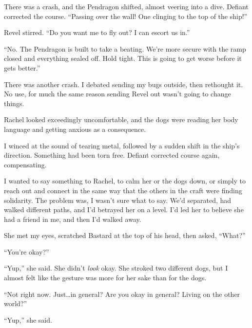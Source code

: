 There was a crash, and the Pendragon shifted, almost veering into a dive.  Defiant corrected the course.  ``Passing over the wall!  One clinging to the top of the ship!''



Revel stirred.  ``Do you want me to fly out?  I can escort us in.''



``No.  The Pendragon is built to take a beating.  We're more secure with the ramp closed and everything sealed off.  Hold tight.  This is going to get worse before it gets better.''



There was another crash.  I debated sending my bugs outside, then rethought it.  No use, for much the same reason sending Revel out wasn't going to change things.



Rachel looked exceedingly uncomfortable, and the dogs were reading her body language and getting anxious as a consequence.



I winced at the sound of tearing metal, followed by a sudden shift in the ship's direction.  Something had been torn free.  Defiant corrected course again, compensating.



I wanted to say something to Rachel, to calm her or the dogs down, or simply to reach out and connect in the same way that the others in the craft were finding solidarity.  The problem was, I wasn't sure what to say.  We'd separated, had walked different paths, and I'd betrayed her on a level.  I'd led her to believe she had a friend in me, and then I'd walked away.



She met my eyes, scratched Bastard at the top of his head, then asked, ``What?''



``You're okay?''



``Yup,'' she said.  She didn't \emph{look} okay.  She stroked two different dogs, but I almost felt like the gesture was more for her sake than for the dogs.



``Not right now.  Just\ldots in general?  Are you okay in general?  Living on the other world?''



``Yup,'' she said.



